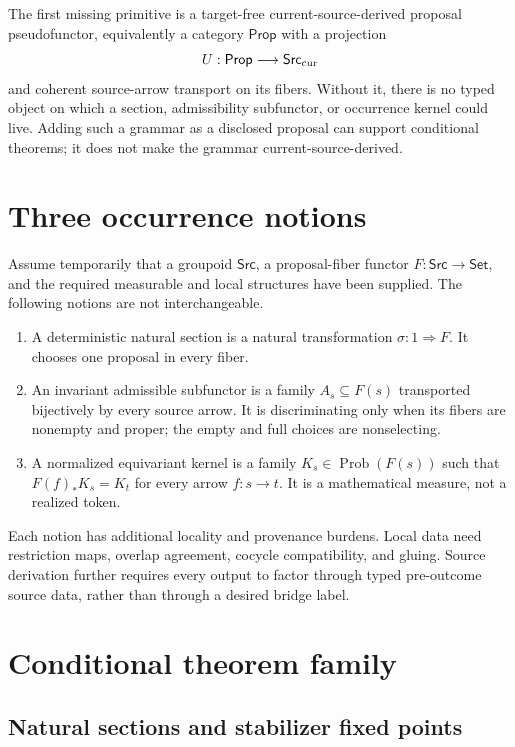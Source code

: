 \documentclass[11pt]{article}
\newcommand{\Src}{\mathsf{Src}}
\newcommand{\Prop}{\mathsf{Prop}}
\newcommand{\Prob}{\operatorname{Prob}}
\begin{document}
The first missing primitive is a target-free current-source-derived proposal
pseudofunctor, equivalently a category $\Prop$ with a projection
\[
  U:\Prop\longrightarrow\Src_{\rm cur}
\]
and coherent source-arrow transport on its fibers.  Without it, there is no
typed object on which a section, admissibility subfunctor, or occurrence
kernel could live.  Adding such a grammar as a disclosed proposal can support
conditional theorems; it does not make the grammar current-source-derived.

\section{Three occurrence notions}

Assume temporarily that a groupoid $\Src$, a proposal-fiber functor
$F:\Src\to\mathsf{Set}$, and the required measurable and local structures
have been supplied.  The following notions are not interchangeable.

\begin{enumerate}[label=(\roman*)]
\item A deterministic natural section is a natural transformation
      $\sigma:1\Rightarrow F$.  It chooses one proposal in every fiber.
\item An invariant admissible subfunctor is a family
      $A_s\subseteq F(s)$ transported bijectively by every source arrow.  It is
      discriminating only when its fibers are nonempty and proper; the empty
      and full choices are nonselecting.
\item A normalized equivariant kernel is a family
      $K_s\in\Prob(F(s))$ such that $F(f)_*K_s=K_t$ for every arrow
      $f:s\to t$.  It is a mathematical measure, not a realized token.
\end{enumerate}

Each notion has additional locality and provenance burdens.  Local data need
restriction maps, overlap agreement, cocycle compatibility, and gluing.
Source derivation further requires every output to factor through typed
pre-outcome source data, rather than through a desired bridge label.

\section{Conditional theorem family}

\subsection{Natural sections and stabilizer fixed points}
\end{document}
